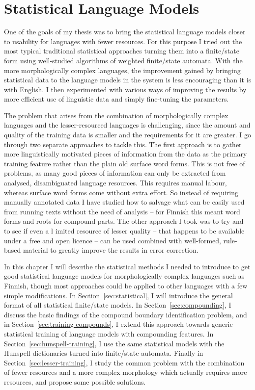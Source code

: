 \documentclass[officiallayout,final]{unihelcompling}
\begin{document}
\chapter{Statistical Language Models}
\label{chap:statistical-models}

One of the goals of my thesis was to bring the statistical \glspl{language
model} closer to usability for  languages with fewer resources. For this
purpose I tried out the most typical traditional statistical approaches turning
them into a finite\-/state form using well-studied algorithms of weighted
finite\-/state automata. With the more morphologically complex languages, the
improvement gained by bringing statistical data to the language models in the
system is less encouraging than it is with English. I then experimented with
various ways of improving the results by more efficient use of linguistic data
and simply fine-tuning the parameters.

The problem that arises from the combination of morphologically complex
languages and the lesser-resourced languages is challenging, since the amount
and quality of the training data is smaller and the requirements for it are
greater. I go through two separate approaches to tackle this. The first
approach is to gather more linguistically motivated pieces of information from
the data as the primary training feature rather than the plain old surface word
forms. This is not free of problems, as many good pieces of information can
only be extracted from analysed, disambiguated language resources.  This
requires manual labour, whereas surface word forms come without extra effort.
So instead of requiring manually annotated data I have studied how to salvage
what can be easily used from running texts without the need of analysis -- for
Finnish this meant word forms and roots for compound parts. The other approach
I took was to try and to see if even a l imited resource of lesser quality --
that happens to be available under a free and open licence -- can be used
combined with well-formed, rule-based material to greatly improve the results
in error correction.

In this chapter I will describe the statistical methods I needed to introduce
to get good statistical language models for morphologically complex languages
such as Finnish, though most approaches could be applied to other languages
with a few simple modifications. In Section~\ref{sec:statistical}, I will
introduce the general format of all statistical finite\-/state models.  In
Section~\ref{sec:compounding}, I discuss the basic findings of the compound
boundary identification problem, and in Section~\ref{sec:training-compounds}, I
extend this approach towards generic statistical training of language models
with compounding features. In Section~\ref{sec:hunspell-training}, I use the
same statistical models with the Hunspell dictionaries turned into
finite\-/state automata. Finally in Section~\ref{sec:lesser-training}, I study
the common problem with the combination of fewer resources and a more complex
morphology which actually requires more resources, and propose some possible
solutions.
\end{document}
